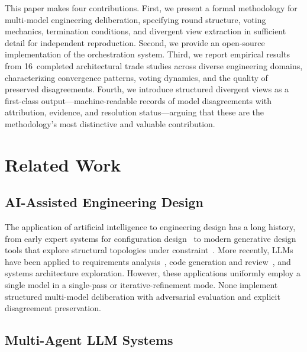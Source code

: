 \documentclass[11pt,a4paper]{article}
\begin{document}
This paper makes four contributions. First, we present a formal methodology for multi-model engineering deliberation, specifying round structure, voting mechanics, termination conditions, and divergent view extraction in sufficient detail for independent reproduction. Second, we provide an open-source implementation of the orchestration system. Third, we report empirical results from 16~completed architectural trade studies across diverse engineering domains, characterizing convergence patterns, voting dynamics, and the quality of preserved disagreements. Fourth, we introduce structured divergent views as a first-class output---machine-readable records of model disagreements with attribution, evidence, and resolution status---arguing that these are the methodology's most distinctive and valuable contribution.

\section{Related Work}
\label{sec:related}

\subsection{AI-Assisted Engineering Design}

The application of artificial intelligence to engineering design has a long history, from early expert systems for configuration design~\cite{mcdermott1982r1} to modern generative design tools that explore structural topologies under constraint~\cite{autodesk2023generative}. More recently, LLMs have been applied to requirements analysis~\cite{arulmohan2023extracting}, code generation and review~\cite{chen2021codex}, and systems architecture exploration. However, these applications uniformly employ a single model in a single-pass or iterative-refinement mode. None implement structured multi-model deliberation with adversarial evaluation and explicit disagreement preservation.

\subsection{Multi-Agent LLM Systems}
\end{document}
